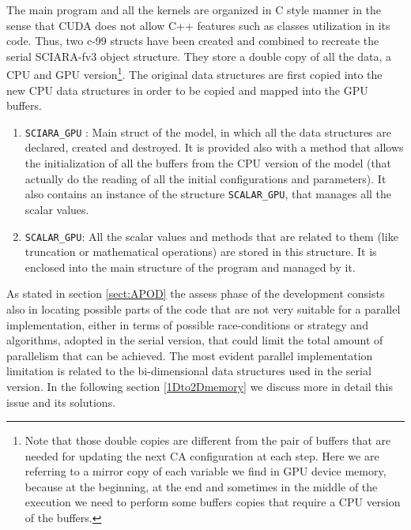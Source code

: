 The main program and all the kernels are organized in C style manner in the
sense that CUDA does not allow C++ features such as classes utilization in its
code.
Thus, two c-99 structs have been created and combined to recreate the serial SCIARA-fv3 object
structure. They store a double copy of all the data, a CPU and GPU
version\footnote{Note that those double copies are different from the pair of
buffers that are needed for updating the next CA configuration at each step.
Here we are referring to a mirror copy of each variable we find in GPU device memory,
because at the beginning, at the end and sometimes in the middle of the
execution we need to perform some buffers copies that require a CPU version of
the buffers.}.
The original data structures are first copied into the new CPU data structures
in order to be copied and mapped into the GPU buffers.

\begin{enumerate}
  \item \texttt{SCIARA\_GPU}  : Main struct of the model, in which all the
  data structures are declared, created and destroyed. It is provided also with
  a method that allows the initialization of all the buffers from the CPU
  version of the model (that actually do the reading of all the initial
  configurations and parameters). It also contains an instance of the structure
  \texttt{SCALAR\_GPU}, that manages all the scalar values.
  \item \texttt{SCALAR\_GPU}: All the scalar values and methods that are related
  to them (like truncation or mathematical operations) are stored in this
  structure.  It is enclosed into the main structure of the program and managed by it.
\end{enumerate}

As stated in section \ref{sect:APOD} the assess phase of the development
consists also in locating possible parts of the code that are not very suitable for a
parallel implementation, either in terms of possible race-conditions or strategy
and algorithms, adopted in the serial version, that could limit the total amount
of parallelism that can be achieved. The most evident parallel implementation
limitation is related to the bi-dimensional data structures used in the serial
version. In the following section \ref{1Dto2Dmemory} we discuss more in detail
this issue and its solutions.

